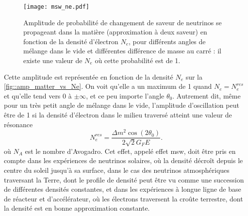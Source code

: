         \begin{figure}[htpb]
          \centering
          \texttt{[image: msw\_ne.pdf]}
          \caption[Effet de résonnance \gls{msw}]{\label{fig::amp_matter_vs_Ne}Amplitude de probabilité de changement de saveur de neutrinos se propageant dans la matière (approximation à deux saveur) en fonction de la densité d'électron $N_e$, pour différents angles de mélange dans le vide et différentes différence de masse au carré : il existe une valeur de $N_e$ où cette probabilité est de 1.}
        \end{figure}
        Cette amplitude est représentée en fonction de la densité $N_e$ sur la \autoref{fig::amp_matter_vs_Ne}. On voit qu'elle a un maximum de 1 quand $N_e = N_e^{res}$ et qu'elle tend vers 0 à $\pm\infty$, et ce peu importe l'angle $\theta_0$. Autrement dit, même pour un très petit angle de mélange dans le vide, l'amplitude d'oscillation peut être de 1 si la densité d'électron dans le milieu traversé atteint une valeur de résonance
        \begin{equation}\label{eq::MSW_condition}
          N_e^{res}  =\frac{\Delta m^2\cos(2\theta_0)}{2\sqrt{2}G_F E}.
        \end{equation}
        où $N_A$ est le nombre d'Avogadro.
        Cet effet, appelé effet \gls{msw}, doit être pris en compte dans les expériences de neutrinos solaires, où la densité décroît depuis le centre du soleil jusqu'à sa surface, dans le cas des neutrinos atmosphériques traversant la Terre, dont le profile de densité peut être vu comme une succession de différentes densités constantes, et dans les expériences à longue ligne de base de réacteur et d'accélérateur, où les électrons traversent la croûte terrestre, dont la densité est en bonne approximation constante.
        
        
